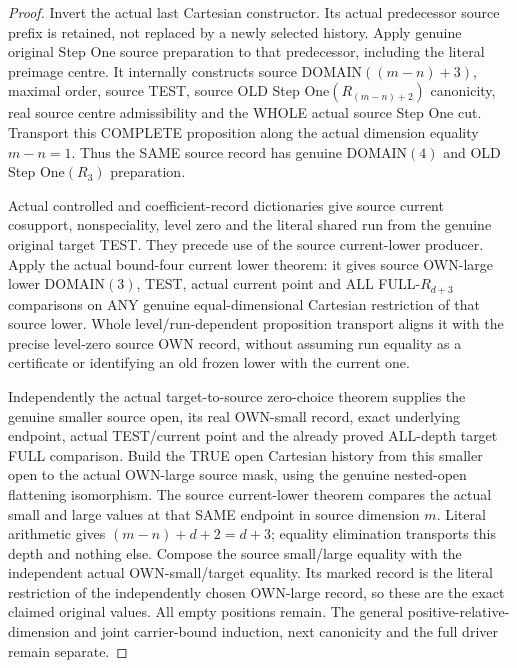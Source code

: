 \begin{proof}
Invert the actual last Cartesian constructor. Its actual predecessor
source prefix is retained, not replaced by a newly selected history.
Apply genuine original Step One source preparation to that predecessor,
including the literal preimage centre. It internally constructs source
DOMAIN$((m-n)+3)$, maximal order, source TEST, source OLD Step
One$(R_{(m-n)+2})$ canonicity, real source centre admissibility and the
WHOLE actual source Step One cut. Transport this COMPLETE proposition
along the actual dimension equality $m-n=1$. Thus the SAME source
record has genuine DOMAIN$(4)$ and OLD Step One$(R_3)$ preparation.

Actual controlled and coefficient-record dictionaries give source
current cosupport, nonspeciality, level zero and the literal shared
run from the genuine original target TEST. They precede use of the
source current-lower producer. Apply the actual bound-four current
lower theorem: it gives source OWN-large lower DOMAIN$(3)$, TEST,
actual current point and ALL FULL-$R_{d+3}$ comparisons on ANY genuine
equal-dimensional Cartesian restriction of that source lower. Whole
level/run-dependent proposition transport aligns it with the precise
level-zero source OWN record, without assuming run equality as a
certificate or identifying an old frozen lower with the current one.

Independently the actual target-to-source zero-choice theorem supplies
the genuine smaller source open, its real OWN-small record, exact
underlying endpoint, actual TEST/current point and the already proved
ALL-depth target FULL comparison. Build the TRUE open Cartesian
history from this smaller open to the actual OWN-large source mask,
using the genuine nested-open flattening isomorphism. The source
current-lower theorem compares the actual small and large values at
that SAME endpoint in source dimension $m$. Literal arithmetic gives
$(m-n)+d+2=d+3$; equality elimination transports this depth and nothing
else. Compose the source small/large equality with the independent
actual OWN-small/target equality. Its marked record is the literal
restriction of the independently chosen OWN-large record, so these
are the exact claimed original values. All empty positions remain.
The general positive-relative-dimension and joint carrier-bound
induction, next canonicity and the full driver remain separate.
\end{proof}
